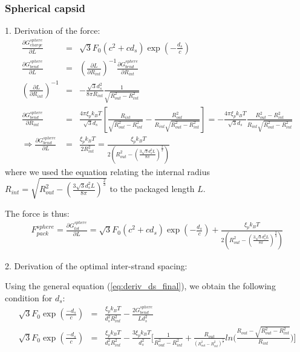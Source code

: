\documentclass{article}
\begin{document}
\subsubsection*{Spherical capsid}
1. Derivation of the force:
\begin{eqnarray*}
 \frac{\partial G_{charge}^{sphere}}{\partial L} & = &  \sqrt{3}F_0(c^2 + cd_s)\exp(-\frac{d_s}{c}) \\
 \frac{\partial G_{bend}^{sphere}}{\partial L} & = & \left( \frac{\partial L}{\partial R_{int}} \right)^{-1} \frac{\partial G_{bend}^{sphere}}{\partial R_{int}} \\
 \left( \frac{\partial L}{\partial R_{int}}\right)^{-1}  & = & -\frac{\sqrt{3}d_s^2}{8\pi R_{int}}\frac{1}{\sqrt{R_{out}^2 - R_{int}^2}} \\
 \frac{\partial G_{bend}^{sphere}}{\partial R_{int}} & = & \frac{4\pi\xi_pk_BT}{\sqrt{3}d_s}[\frac{R_{int}}{\sqrt{R_{out}^2 - R_{int}^2}} - \frac{R_{out}^2}{R_{int}\sqrt{R_{out}^2 - R_{int}^2}}] = -\frac{4\pi\xi_pk_BT}{\sqrt{3}d_s} \frac{R_{out}^2 - R_{int}^2}{R_{int}\sqrt{R_{out}^2 - R_{int}^2}}  \\
 \Rightarrow  \frac{\partial G_{bend}^{sphere}}{\partial L} & = & \frac{\xi_pk_BT}{2R_{int}^2} =\frac{\xi_pk_BT}{2(R_{out}^2 - (\frac{3\sqrt{3}d_s^2L}{8\pi})^\frac23)}
\end{eqnarray*}
where we used the equation relating the internal radius $R_{int} = \sqrt{R_{out}^2 - (\frac{3\sqrt{3}d_s^2L}{8\pi})^\frac23}$ to the packaged length $L$.

The force is thus:
\begin{eqnarray*}
    F_{pack}^{sphere} = \frac{\partial G_{tot}^{sphere}}{\partial L}= \sqrt{3}F_0(c^2 + cd_s)\exp(-\frac{d_s}{c}) + \frac{\xi_pk_BT}{2(R_{out}^2 - (\frac{3\sqrt{3}d_s^2L}{8\pi})^\frac23)}
\end{eqnarray*}

2. Derivation of the optimal inter-strand spacing:

Using the general equation (\ref{eq:deriv_ds_final}), we obtain the following condition for $d_s$:
\begin{eqnarray*}
\sqrt{3}F_0 \exp{ \left( \frac{-d_s}{c} \right)} &=& \frac{\xi_p k_B T}{d_s^2 R_{int}^2 } - \frac{2 G_{bend}^{sphere}}{Ld_s^2} \\
\sqrt{3}F_0 \exp{ \left( \frac{-d_s}{c} \right)} &=& \frac{\xi_p k_B T}{d_s^2 R_{int}^2 } - \frac{3\xi_p k_B T}{d_s^2}\bigg[\frac{1}{R_{out}^2 - R_{int}^2} + \frac{R_{out}}{^(R_{out}^2 - R_{int}^2)^\frac32}ln\bigg(\frac{R_{out} - \sqrt{R_{out}^2 - R_{int}^2}}{R_{int}}\bigg) \bigg]  
\end{eqnarray*}
\end{document}
